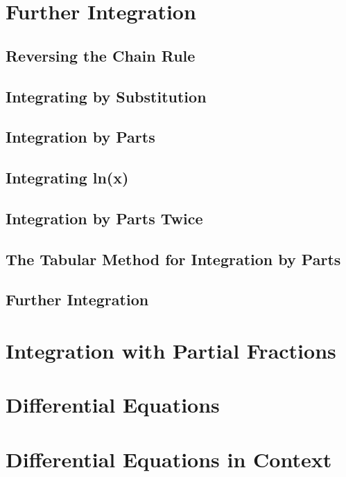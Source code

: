 \documentclass[../maths.tex]{subfiles}
\begin{document}
\section{Further Integration}
\subsection*{Reversing the Chain Rule}
\subsection*{Integrating by Substitution}
\subsection*{Integration by Parts}
\subsection*{Integrating ln(x)}
\subsection*{Integration by Parts Twice}
\subsection*{The Tabular Method for Integration by Parts}
\subsection*{Further Integration}
\section{Integration with Partial Fractions}
\section{Differential Equations}
\section{Differential Equations in Context}
\end{document}
